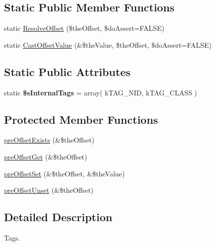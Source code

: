 \subsection*{Static Public Member Functions}
\begin{DoxyCompactItemize}
\item 
static \hyperlink{class_ontology_wrapper_1_1_ontology_object_a12e1e673943d68230be1807bf6bd63cb}{Resolve\-Offset} (\$the\-Offset, \$do\-Assert=F\-A\-L\-S\-E)
\item 
static \hyperlink{class_ontology_wrapper_1_1_ontology_object_aa05e64fb4bbc9b30d15a8e2d1cfe9874}{Cast\-Offset\-Value} (\&\$the\-Value, \$the\-Offset, \$do\-Assert=F\-A\-L\-S\-E)
\end{DoxyCompactItemize}
\subsection*{Static Public Attributes}
\begin{DoxyCompactItemize}
\item 
\hypertarget{class_ontology_wrapper_1_1_ontology_object_a642b14dab22e6fd254de345a0b79f05b}{static {\bfseries \$s\-Internal\-Tags} = array( k\-T\-A\-G\-\_\-\-N\-I\-D, k\-T\-A\-G\-\_\-\-C\-L\-A\-S\-S )}\label{class_ontology_wrapper_1_1_ontology_object_a642b14dab22e6fd254de345a0b79f05b}

\end{DoxyCompactItemize}
\subsection*{Protected Member Functions}
\begin{DoxyCompactItemize}
\item 
\hyperlink{class_ontology_wrapper_1_1_ontology_object_aa8827d96f0f76ffdebde8346e331699c}{pre\-Offset\-Exists} (\&\$the\-Offset)
\item 
\hyperlink{class_ontology_wrapper_1_1_ontology_object_ab00c85a26561bf83f4721fa0edab5764}{pre\-Offset\-Get} (\&\$the\-Offset)
\item 
\hyperlink{class_ontology_wrapper_1_1_ontology_object_aa7e9b36fdc00584a143e6c920b6d2c87}{pre\-Offset\-Set} (\&\$the\-Offset, \&\$the\-Value)
\item 
\hyperlink{class_ontology_wrapper_1_1_ontology_object_a4ff5501f4fb4cf9fa88dbf5b3f845a1c}{pre\-Offset\-Unset} (\&\$the\-Offset)
\end{DoxyCompactItemize}


\subsection{Detailed Description}
Tags.

